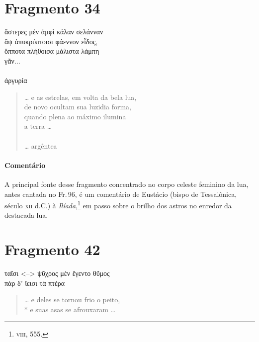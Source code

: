 \section{Fragmento 34}

\begin{gkverse}
ἄστερες μὲν ἀμφὶ κάλαν σελάνναν\\
ἂψ ἀπυκρύπτοισι φάεννον εἶδος,\\
ὄπποτα πλήθοισα μάλιστα λάμπη\\
γᾶν...\\
\hspace*{23mm}\\
ἀργυρία
\end{gkverse}

\begin{verse}
\ldots{} e as estrelas, em volta da bela lua,\\
de novo ocultam sua luzidia forma,\\
quando plena ao máximo ilumina\\
a terra \ldots{}\\
\hspace*{23mm}\\
\ldots{} argêntea
\end{verse}

\medskip

{\paragraph{Comentário} A principal fonte desse fragmento concentrado no corpo celeste feminino da lua, antes cantada no Fr.\,96, é
um comentário de Eustácio (bispo de Tessalônica, século \textsc{xii} d.C.) à
\textit{Ilíada},\footnote{\textsc{viii}, 555.} em passo sobre o brilho dos astros no enredor da destacada lua.} 


\pagebreak
\section{Fragmento 42}

\begin{gkverse}
ταῖσι <--> ψῦχρος μὲν ἔγεντο θῦμος\\
πὰρ δ’ ἴεισι τὰ πτέρα
\end{gkverse}

\begin{verse}
\ldots{} e deles se tornou frio o peito,\\*
e suas asas se afrouxaram \ldots{}
\end{verse}

